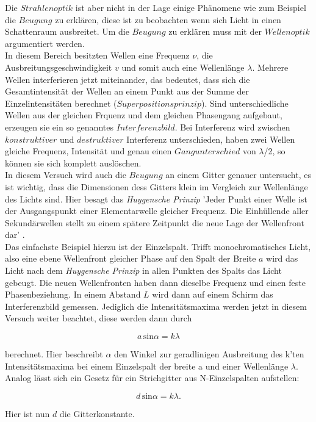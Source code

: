         \noindent Die $Strahlenoptik$ ist aber nicht in der Lage einige Phänomene wie zum Beispiel die $Beugung$ zu erklären, diese ist zu 
        beobachten wenn sich Licht in einen Schattenraum ausbreitet. Um die $Beugung$ zu erklären muss mit der $Wellenoptik$ argumentiert werden.\\
        In diesem Bereich besitzten Wellen eine Frequenz $\nu$, die Ausbreitungsgeschwindigkeit $v$ und somit auch eine Wellenlänge $\lambda$.
        Mehrere Wellen interferieren jetzt miteinander, das bedeutet, dass sich die Gesamtintensität der Wellen an einem Punkt aus der Summe der 
        Einzelintensitäten berechnet ($Superpositionsprinzip$). Sind unterschiedliche Wellen aus der gleichen Frquenz und dem gleichen Phasengang 
        aufgebaut, erzeugen sie ein so genanntes $Interferenzbild$. Bei Interferenz wird zwischen $konstruktiver$ und $destruktiver$ Interferenz 
        unterschieden, haben zwei Wellen gleiche Frequenz, Intensität und genau einen $Gangunterschied$ von $\lambda$/2, so können sie sich 
        komplett auslöschen.\\
        In diesem Versuch wird auch die $Beugung$ an einem Gitter genauer untersucht, es ist wichtig, dass die Dimensionen dess Gitters klein im 
        Vergleich zur Wellenlänge des Lichts sind. Hier besagt das \textit{Huygensche Prinzip} 'Jeder Punkt einer Welle ist der Ausgangspunkt einer 
        Elementarwelle gleicher Frequenz. Die Einhüllende aller Sekundärwellen stellt zu einem spätere Zeitpunkt die neue Lage der Wellenfront
        dar' \cite{400}.\\
        Das einfachste Beispiel hierzu ist der Einzelspalt. Trifft monochromatisches Licht, also eine ebene Wellenfront gleicher Phase auf den 
        Spalt der Breite $a$ wird das Licht nach dem \textit{Huygensche Prinzip} in allen Punkten des Spalts das Licht gebeugt. Die neuen Wellenfronten 
        haben dann dieselbe Frequenz und einen feste Phasenbeziehung. In einem Abstand $L$ wird dann auf einem Schirm das Interferenzbild gemessen. 
        Jediglich die Intensitätsmaxima werden jetzt in diesem Versuch weiter beachtet, diese werden dann durch 

        \begin{equation}
            a \, \text{sin} \alpha = k \lambda
        \end{equation}

        \noindent
        berechnet. Hier beschreibt $\alpha$ den Winkel zur geradlinigen Ausbreitung des k'ten Intensitätsmaxima bei einem Einzelspalt der breite a 
        und einer Wellenlänge $\lambda$.\\
        Analog lässt sich ein Gesetz für ein Strichgitter aus N-Einzelspalten aufstellen:

        \begin{equation}
            d \, \text{sin} \alpha = k \lambda.
        \end{equation}

        \noindent Hier ist nun $d$ die Gitterkonstante.
        